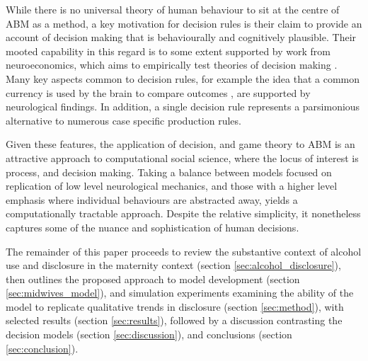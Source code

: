 While there is no universal theory of human behaviour to sit at the centre of \ac{ABM} as a method, a key motivation for decision rules is their claim to provide an account of decision making that is behaviourally and cognitively plausible. Their mooted capability in this regard is to some extent supported by work from neuroeconomics, which aims to empirically test theories of decision making \citep{Rustichini2009}. Many key aspects common to decision rules, for example the idea that a common currency is used by the brain to compare outcomes \citep{Padoa-Schioppa2006,Padoa-Schioppa2008}, are supported by neurological findings. In addition, a single decision rule represents a parsimonious alternative to numerous case specific production rules. 

Given these features, the application of decision, and game theory to \ac{ABM} is an attractive approach to computational social science, where the locus of interest is process, and decision making. Taking a balance between models focused on replication of low level neurological mechanics, and those with a higher level emphasis where individual behaviours are abstracted away, yields a computationally tractable approach. Despite the relative simplicity, it nonetheless captures some of the nuance and sophistication of human decisions.


The remainder of this paper proceeds to review the substantive context of alcohol use and disclosure in the maternity context (section \ref{sec:alcohol_disclosure}), then outlines the proposed approach to model development (section \ref{sec:midwives_model}), and simulation experiments examining the ability of the model to replicate qualitative trends in disclosure (section \ref{sec:method}), with selected results (section \ref{sec:results}), followed by a discussion contrasting the decision models (section \ref{sec:discussion}), and conclusions (section \ref{sec:conclusion}).